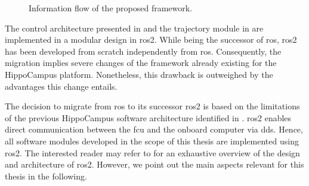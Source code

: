 \begin{figure}
	\caption{Information flow of the proposed framework.}
	\label{fig:information-flow}
\end{figure}

The control architecture presented in  and the trajectory module in  are implemented in a modular design in \ac{ros2}. While being the successor of \ac{ros}, \ac{ros2} has been developed from scratch independently from \ac{ros}.
Consequently, the migration implies severe changes of the framework already existing for the HippoCampus platform. Nonetheless, this drawback is outweighed by the advantages this change entails.

The decision to migrate from \ac{ros} to its successor \ac{ros2} is based on the limitations of the previous HippoCampus software architecture identified in .
\ac{ros2} enables direct communication between the \ac{fcu} and the onboard computer via \ac{dds}. Hence, all software modules developed in the scope of this thesis are implemented using \ac{ros2}. The interested reader may refer to \cite{ros2} for an exhaustive overview of the design and architecture of \ac{ros2}. However, we point out the main aspects relevant for this thesis in the following.

